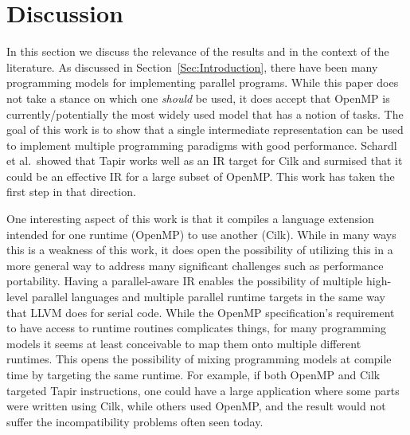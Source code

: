 \documentclass[sigconf]{acmart}
\begin{document}
\section{Discussion} \label{Sec:Discussion}

In this section we discuss the relevance of the results and in the context of the
literature. As discussed in Section~\ref{Sec:Introduction},
there have been many programming models for implementing parallel programs. While
this paper does not take a stance on which one \emph{should} be used, it does
accept that OpenMP is currently/potentially the most widely used model that has
a notion of tasks. The goal of this work is to show that a single intermediate
representation can be used to implement multiple programming paradigms with
good performance. Schardl et al.\ showed that Tapir works well as an IR target
for Cilk and surmised that it could be an effective IR for a large subset of
  OpenMP. This work has taken the first step in that direction.

One interesting aspect of this work is that it compiles a language extension
intended for one runtime (OpenMP) to use another (Cilk). While in
many ways this is a weakness of this work, it does open the possibility of
utilizing this in a more general way to address many significant challenges
such as performance portability. Having a parallel-aware IR enables the
possibility of multiple high-level parallel languages and multiple parallel
runtime targets in the same way that LLVM does for serial code. While the
OpenMP specification's requirement to have access to runtime routines
complicates things, for many programming models it seems at least conceivable
to map them onto multiple different runtimes. This opens the possibility of
mixing programming models at compile time by targeting the same runtime. For
example, if both OpenMP and Cilk targeted Tapir instructions, one could have a
large application where some parts were written using Cilk, while others used
OpenMP, and the result would not suffer the incompatibility problems often
seen today.
\end{document}
